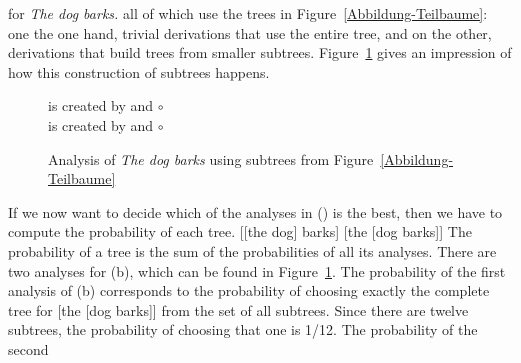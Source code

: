 for \emph{The dog
  barks.} all of which use the trees in Figure~\ref{Abbildung-Teilbaume}: 
  one the one hand, trivial derivations that use the entire tree, and on the other, derivations that
  build trees from smaller subtrees.
Figure~\ref{Abbildung-Analyse} gives an impression of how this construction of subtrees happens.
\begin{figure}
\hfill
{}
is created by
and
$\circ$
\hfill\mbox{}
\\[3ex]
\hfill{}
is created by
and
$\circ$
\hfill\mbox{}
\caption{\label{Abbildung-Analyse}Analysis of \emph{The dog barks} using subtrees from Figure~\ref{Abbildung-Teilbaume}}
\end{figure}%
If we now want to decide which of the analyses in () is the best, then we have to compute the probability of each tree.
\eal
\ex {}[[the dog] barks]
\ex {}[the [dog barks]]
\zl
The probability of a tree is the sum of the probabilities of all its analyses.
There are two analyses for (b), which can be found in Figure~\ref{Abbildung-Analyse}.
The probability of the first analysis of (b) corresponds to the probability of choosing exactly the complete tree for [the [dog barks]] from
the set of all subtrees. Since there are twelve subtrees, the probability of choosing that one is 1/12. The probability of the second
